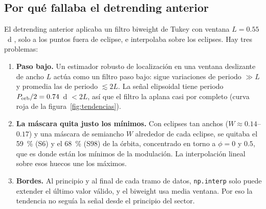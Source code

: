 \documentclass[11pt,a4paper]{article}
\newcommand{\porb}{P_{\rm orb}}
\begin{document}
\subsection{Por qué fallaba el detrending anterior}
El detrending anterior aplicaba un filtro biweight de Tukey \citep{Mosteller1977} con ventana
$L=0.55$~d \citep[\texttt{wotan};][]{Hippke2019}, solo a los puntos fuera de eclipse, e
interpolaba sobre los eclipses. Hay tres problemas:
\begin{enumerate}
\item \textbf{Paso bajo.} Un estimador robusto de localización en una ventana deslizante de ancho $L$
  actúa como un filtro paso bajo: sigue variaciones de periodo $\gg L$ y promedia las de periodo
  $\lesssim 2L$. La señal elipsoidal tiene periodo $\porb/2=0.74$~d $<2L$, así que el filtro la
  aplana casi por completo (curva roja de la figura~\ref{fig:tendencias}).
\item \textbf{La máscara quita justo los mínimos.} Con eclipses tan anchos ($W\approx0.14$--$0.17$) y
  una máscara de semiancho $W$ alrededor de cada eclipse, se quitaba el 59~\% (S6) y el 68~\% (S98) de
  la órbita, concentrado en torno a $\phi=0$ y $0.5$, que es donde están los mínimos de la
  modulación. La interpolación lineal sobre esos huecos une los máximos.
\item \textbf{Bordes.} Al principio y al final de cada tramo de datos, \texttt{np.interp} solo puede
  extender el último valor válido, y el biweight usa media ventana. Por eso la tendencia no seguía
  la señal desde el principio del sector.
\end{enumerate}
\end{document}
